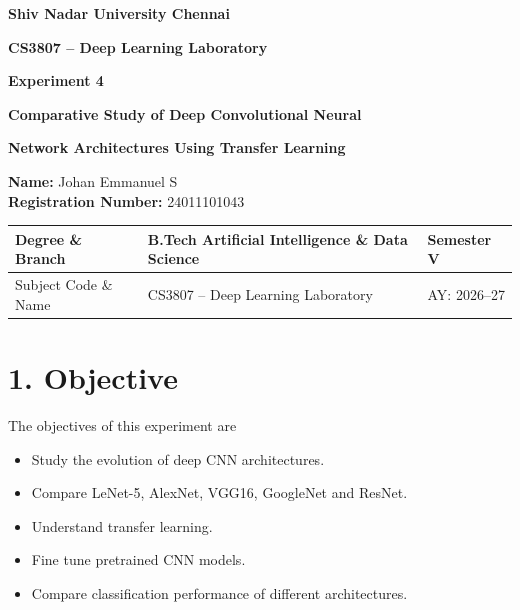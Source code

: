 \documentclass[11pt]{article}
\begin{document}

\begin{center}

{\Large\textbf{Shiv Nadar University Chennai}}

\vspace{3mm}

{\large\textbf{CS3807 -- Deep Learning Laboratory}}

\vspace{3mm}

{\Large\textbf{Experiment 4}}

\vspace{2mm}

{\Large\textbf{Comparative Study of Deep Convolutional Neural}}

{\Large\textbf{Network Architectures Using Transfer Learning}}

\end{center}

\begin{flushleft}
\textbf{Name:} Johan Emmanuel S\\
\textbf{Registration Number:} 24011101043\\
\end{flushleft}

\vspace{5mm}

\begin{tabular}{|p{4cm}|p{8cm}|p{2cm}|}
\hline
Degree \& Branch &
B.Tech Artificial Intelligence \& Data Science &
Semester V\\
\hline
Subject Code \& Name &
CS3807 -- Deep Learning Laboratory &
AY: 2026--27\\
\hline
\end{tabular}


\section*{1. Objective}

The objectives of this experiment are

\begin{itemize}

\item Study the evolution of deep CNN architectures.

\item Compare LeNet-5, AlexNet, VGG16, GoogleNet and ResNet.

\item Understand transfer learning.

\item Fine tune pretrained CNN models.

\item Compare classification performance of different architectures.

\end{itemize}
\end{document}
